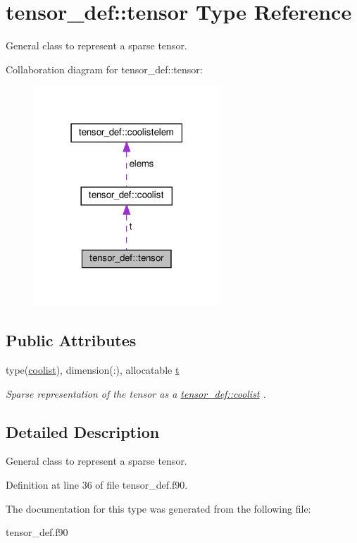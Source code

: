 \hypertarget{structtensor__def_1_1tensor}{}\section{tensor\+\_\+def\+:\+:tensor Type Reference}
\label{structtensor__def_1_1tensor}


General class to represent a sparse tensor.  




Collaboration diagram for tensor\+\_\+def\+:\+:tensor\+:\nopagebreak
\begin{figure}[H]
\begin{center}
\leavevmode
\includegraphics[width=198pt]{structtensor__def_1_1tensor__coll__graph}
\end{center}
\end{figure}
\subsection*{Public Attributes}
\begin{DoxyCompactItemize}
\item 
\mbox{\label{structtensor__def_1_1tensor_a4f17ddd2ce1b8ee95414c9e0c395bfb7}} 
type(\hyperlink{structtensor__def_1_1coolist}{coolist}), dimension(\+:), allocatable \hyperlink{structtensor__def_1_1tensor_a4f17ddd2ce1b8ee95414c9e0c395bfb7}{t}
\begin{DoxyCompactList}\small\item\em Sparse representation of the tensor as a \hyperlink{structtensor__def_1_1coolist}{tensor\+\_\+def\+::coolist} . \end{DoxyCompactList}\end{DoxyCompactItemize}


\subsection{Detailed Description}
General class to represent a sparse tensor. 

Definition at line 36 of file tensor\+\_\+def.\+f90.



The documentation for this type was generated from the following file\+:\begin{DoxyCompactItemize}
\item 
tensor\+\_\+def.\+f90\end{DoxyCompactItemize}
